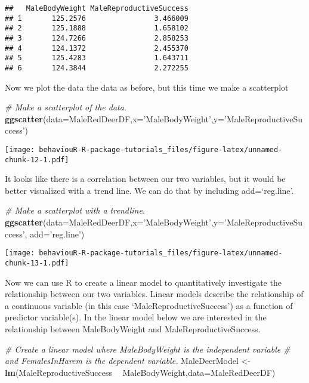 \documentclass[]{book}
\newenvironment{Shaded}{\begin{snugshade}}{\end{snugshade}}
\newcommand{\CommentTok}[1]{\textcolor[rgb]{0.56,0.35,0.01}{\textit{#1}}}
\newcommand{\DataTypeTok}[1]{\textcolor[rgb]{0.13,0.29,0.53}{#1}}
\newcommand{\KeywordTok}[1]{\textcolor[rgb]{0.13,0.29,0.53}{\textbf{#1}}}
\newcommand{\NormalTok}[1]{#1}
\newcommand{\OperatorTok}[1]{\textcolor[rgb]{0.81,0.36,0.00}{\textbf{#1}}}
\newcommand{\StringTok}[1]{\textcolor[rgb]{0.31,0.60,0.02}{#1}}
\begin{document}
\begin{verbatim}
##   MaleBodyWeight MaleReproductiveSuccess
## 1       125.2576                3.466009
## 2       125.1888                1.658102
## 3       124.7266                2.858253
## 4       124.1372                2.455370
## 5       125.4283                1.643711
## 6       124.3844                2.272255
\end{verbatim}

Now we plot the data the data as before, but this time we make a scatterplot

\begin{Shaded}
\begin{Highlighting}[]
\CommentTok{# Make a scatterplot of the data.}
\KeywordTok{ggscatter}\NormalTok{(}\DataTypeTok{data=}\NormalTok{MaleRedDeerDF,}\DataTypeTok{x=}\StringTok{'MaleBodyWeight'}\NormalTok{,}\DataTypeTok{y=}\StringTok{'MaleReproductiveSuccess'}\NormalTok{)}
\end{Highlighting}
\end{Shaded}

\texttt{[image: behaviouR-R-package-tutorials\_files/figure-latex/unnamed-chunk-12-1.pdf]}

It looks like there is a correlation between our two variables, but it would be better visualized with a trend line. We can do that by including add=`reg.line'.

\begin{Shaded}
\begin{Highlighting}[]
\CommentTok{# Make a scatterplot with a trendline.}
\KeywordTok{ggscatter}\NormalTok{(}\DataTypeTok{data=}\NormalTok{MaleRedDeerDF,}\DataTypeTok{x=}\StringTok{'MaleBodyWeight'}\NormalTok{,}\DataTypeTok{y=}\StringTok{'MaleReproductiveSuccess'}\NormalTok{,}
          \DataTypeTok{add=}\StringTok{'reg.line'}\NormalTok{)}
\end{Highlighting}
\end{Shaded}

\texttt{[image: behaviouR-R-package-tutorials\_files/figure-latex/unnamed-chunk-13-1.pdf]}

Now we can use R to create a linear model to quantitatively investigate the relationship between our two variables. Linear models describe the relationship of a continuous variable (in this case `MaleReproductiveSuccess') as a function of predictor variable(s). In the linear model below we are interested in the relationship between MaleBodyWeight and MaleReproductiveSuccess.

\begin{Shaded}
\begin{Highlighting}[]
\CommentTok{# Create a linear model where MaleBodyWeight is the independent variable}
\CommentTok{# and FemalesInHarem is the dependent variable.}
\NormalTok{MaleDeerModel <-}\StringTok{ }\KeywordTok{lm}\NormalTok{(MaleReproductiveSuccess }\OperatorTok{~}\StringTok{ }\NormalTok{MaleBodyWeight,}\DataTypeTok{data=}\NormalTok{MaleRedDeerDF)}
\end{Highlighting}
\end{Shaded}
\end{document}
